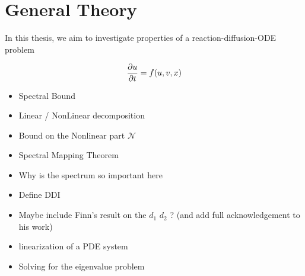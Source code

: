 \section{General Theory}

In this thesis, we aim to investigate properties of a reaction-diffusion-ODE problem
 
\begin{equation}
	\frac{\partial u}{\partial t} = f(u, v, x)
\end{equation}

\begin{itemize}
    \item Spectral Bound
    \item Linear / NonLinear decomposition
    \item Bound on the Nonlinear part $\mathcal N$
    \item Spectral Mapping Theorem
    \item Why is the spectrum so important here
    \item Define DDI
    \item Maybe include Finn's result on the $d_1$ $d_2$ ? (and add full acknowledgement to his work)
    \item linearization of a PDE system
    \item Solving for the eigenvalue problem   
\end{itemize}